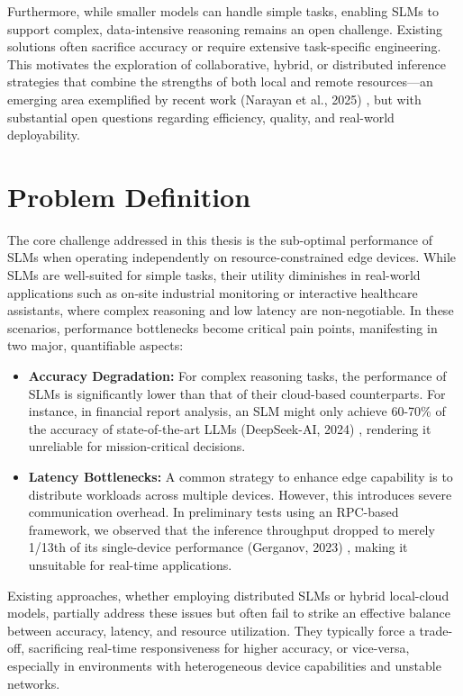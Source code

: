 Furthermore, while smaller models can handle simple tasks, enabling SLMs to support complex, data-intensive reasoning remains an open challenge. Existing solutions often sacrifice accuracy or require extensive task-specific engineering. This motivates the exploration of collaborative, hybrid, or distributed inference strategies that combine the strengths of both local and remote resources—an emerging area exemplified by recent work (Narayan et al., 2025) \cite{Narayan2025Minions}, but with substantial open questions regarding efficiency, quality, and real-world deployability.

\section{Problem Definition}
The core challenge addressed in this thesis is the sub-optimal performance of SLMs when operating independently on resource-constrained edge devices. While SLMs are well-suited for simple tasks, their utility diminishes in real-world applications such as on-site industrial monitoring or interactive healthcare assistants, where complex reasoning and low latency are non-negotiable. In these scenarios, performance bottlenecks become critical pain points, manifesting in two major, quantifiable aspects:

\begin{itemize}
    \item \textbf{Accuracy Degradation:} For complex reasoning tasks, the performance of SLMs is significantly lower than that of their cloud-based counterparts. For instance, in financial report analysis, an SLM might only achieve 60-70\% of the accuracy of state-of-the-art LLMs (DeepSeek-AI, 2024) \cite{DeepSeek-RL}, rendering it unreliable for mission-critical decisions.
    \item \textbf{Latency Bottlenecks:} A common strategy to enhance edge capability is to distribute workloads across multiple devices. However, this introduces severe communication overhead. In preliminary tests using an RPC-based framework, we observed that the inference throughput dropped to merely 1/13th of its single-device performance (Gerganov, 2023) \cite{LlamaCpp-Issue}, making it unsuitable for real-time applications.
\end{itemize}

Existing approaches, whether employing distributed SLMs or hybrid local-cloud models, partially address these issues but often fail to strike an effective balance between accuracy, latency, and resource utilization. They typically force a trade-off, sacrificing real-time responsiveness for higher accuracy, or vice-versa, especially in environments with heterogeneous device capabilities and unstable networks.

